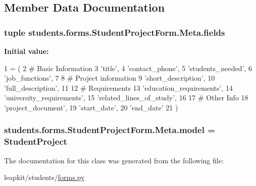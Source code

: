 \subsection{Member Data Documentation}
\hypertarget{classstudents_1_1forms_1_1_student_project_form_1_1_meta_af56b70a2bc05a620e95cb6696821f537}{
\subsubsection[{fields}]{\setlength{\rightskip}{0pt plus 5cm}tuple students.\-forms.\-Student\-Project\-Form.\-Meta.\-fields\hspace{0.3cm}{\ttfamily [static]}}}\label{classstudents_1_1forms_1_1_student_project_form_1_1_meta_af56b70a2bc05a620e95cb6696821f537}
{\bfseries Initial value\-:}
\begin{DoxyCode}
1 = (
2             \textcolor{comment}{# Basic Information}
3             \textcolor{stringliteral}{'title'},
4             \textcolor{stringliteral}{'contact\_phone'},
5             \textcolor{stringliteral}{'students\_needed'},
6             \textcolor{stringliteral}{'job\_functions'},
7 
8             \textcolor{comment}{# Project information}
9             \textcolor{stringliteral}{'short\_description'},
10             \textcolor{stringliteral}{'full\_description'},
11 
12             \textcolor{comment}{# Requirements}
13             \textcolor{stringliteral}{'education\_requirements'},
14             \textcolor{stringliteral}{'university\_requirements'},
15             \textcolor{stringliteral}{'related\_lines\_of\_study'},
16 
17             \textcolor{comment}{# Other Info}
18             \textcolor{stringliteral}{'project\_document'},
19             \textcolor{stringliteral}{'start\_date'},
20             \textcolor{stringliteral}{'end\_date'}
21         )
\end{DoxyCode}
\hypertarget{classstudents_1_1forms_1_1_student_project_form_1_1_meta_a91b648e7905903f18283f7f8b2dd8dc6}{
\subsubsection[{model}]{\setlength{\rightskip}{0pt plus 5cm}students.\-forms.\-Student\-Project\-Form.\-Meta.\-model = Student\-Project\hspace{0.3cm}{\ttfamily [static]}}}\label{classstudents_1_1forms_1_1_student_project_form_1_1_meta_a91b648e7905903f18283f7f8b2dd8dc6}


The documentation for this class was generated from the following file\-:\begin{DoxyCompactItemize}
\item 
leapkit/students/\hyperlink{forms_8py}{forms.\-py}\end{DoxyCompactItemize}
